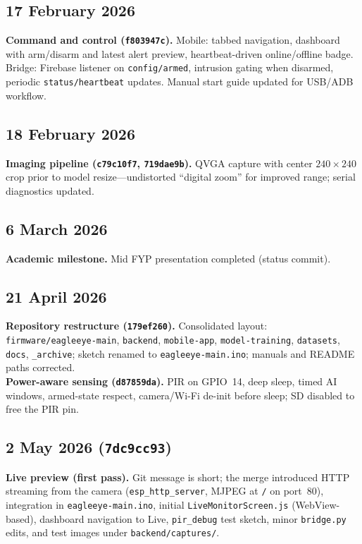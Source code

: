 \documentclass[11pt,a4paper]{article}
\begin{document}
\subsection{17 February 2026}
\textbf{Command and control (\texttt{f803947c}).} Mobile: tabbed navigation, dashboard with arm/disarm and latest alert preview, heartbeat-driven online/offline badge. Bridge: Firebase listener on \texttt{config/armed}, intrusion gating when disarmed, periodic \texttt{status/heartbeat} updates. Manual start guide updated for USB/ADB workflow.

\subsection{18 February 2026}
\textbf{Imaging pipeline (\texttt{c79c10f7}, \texttt{719dae9b}).} QVGA capture with center $240{\times}240$ crop prior to model resize---undistorted ``digital zoom'' for improved range; serial diagnostics updated.

\subsection{6 March 2026}
\textbf{Academic milestone.} Mid FYP presentation completed (status commit).

\subsection{21 April 2026}
\textbf{Repository restructure (\texttt{179ef260}).} Consolidated layout: \texttt{firmware/eagleeye-main}, \texttt{backend}, \texttt{mobile-app}, \texttt{model-training}, \texttt{datasets}, \texttt{docs}, \texttt{\_archive}; sketch renamed to \texttt{eagleeye-main.ino}; manuals and README paths corrected. \\
\textbf{Power-aware sensing (\texttt{d87859da}).} PIR on GPIO~14, deep sleep, timed AI windows, armed-state respect, camera/Wi-Fi de-init before sleep; SD disabled to free the PIR pin.

\subsection{2 May 2026 (\texttt{7dc9cc93})}
\textbf{Live preview (first pass).} Git message is short; the merge introduced HTTP streaming from the camera (\texttt{esp\_http\_server}, MJPEG at \texttt{/} on port~80), integration in \texttt{eagleeye-main.ino}, initial \texttt{LiveMonitorScreen.js} (WebView-based), dashboard navigation to Live, \texttt{pir\_debug} test sketch, minor \texttt{bridge.py} edits, and test images under \texttt{backend/captures/}.
\end{document}
